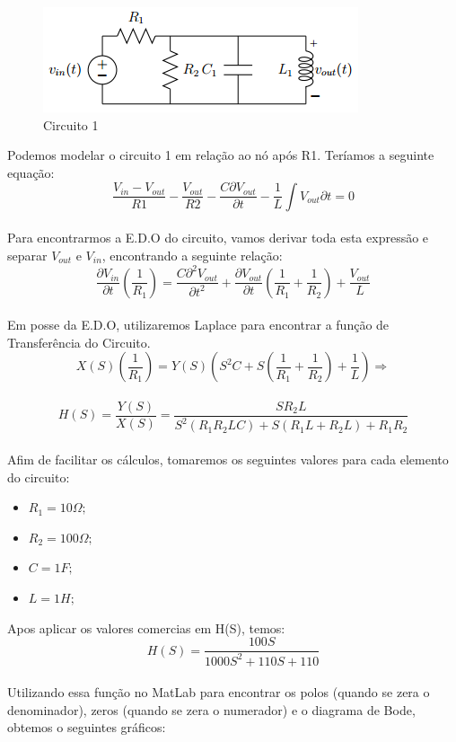 \documentclass[a4paper, 12pt]{article}
\begin{document}
			\begin{figure}[!ht]
				\centering
				\includegraphics{img/circuito1.png}
				\caption{Circuito 1}	
			\end{figure}			
			Podemos modelar o circuito 1 em relação ao nó após R1. Teríamos a seguinte equação: \\
			\[
				\frac{V_{in} - V_{out}}{R1} - \frac{V_{out}}{R2} - \frac{C\partial V_{out}}{\partial t} - \frac{1}{L} \int V_{out}{\partial t} = 0
			\] 	\\
			Para encontrarmos a E.D.O do circuito, vamos derivar toda esta expressão e separar $V_{out}$ e $V_{in}$, encontrando a seguinte relação:
			\[
				\frac{\partial V_{in}}{\partial t} \left(\frac{1}{R_{1}}\right) = \frac{C \partial^{2} V_{out}}{\partial t^{2}} + \frac{\partial V_{out}}{\partial t} \left(\frac{1}{R_{1}} + \frac{1}{R_{2}} \right) + \frac{V_{out}}{L}
			\] 	\\			
			Em posse da E.D.O, utilizaremos Laplace para encontrar a função de Transferência do Circuito.
			\[
				X(S) \left(\frac{1}{R_{1}}\right) = Y(S)\left(S^{2}C + S \left(\frac{1}{R_{1}} + \frac{1}{R_{2}}\right) + \frac{1}{L} \right) \Rightarrow
			\] 	\\	
			\[
				H(S) = \frac{Y(S)}{X(S)} = \frac{SR_{2}L}{S^{2}\left(R_{1}R_{2}LC\right) + S\left(R_{1}L + R_{2}L\right) + R_{1}R_{2}}
			\] 	\\		
			
			Afim de facilitar os cálculos, tomaremos os seguintes valores para cada elemento do circuito:
			 \begin{itemize}
			 	\item $R_{1} = 10\Omega;$
			 	\item $R_{2} = 100\Omega;$
			 	\item $C = 1F;$
			 	\item $L = 1H;$
			 \end{itemize}		
			 
			Apos aplicar os valores comercias em H(S), temos:
			\[
			H(S) = \frac{100S}{1000S^{2} + 110S + 110}
			\] 	\\					
			
			Utilizando essa função no MatLab para encontrar os polos (quando se zera o denominador), zeros (quando se zera o numerador) e o diagrama de Bode, obtemos o seguintes gráficos:
			
\end{document}

